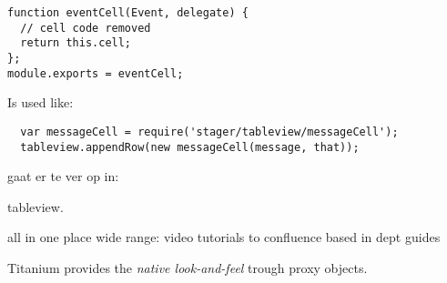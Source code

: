 \begin{verbatim}
function eventCell(Event, delegate) {
  // cell code removed
  return this.cell;
};
module.exports = eventCell;
\end{verbatim}

Is used like:
\begin{verbatim}
  var messageCell = require('stager/tableview/messageCell');
  tableview.appendRow(new messageCell(message, that));
\end{verbatim}

gaat er te ver op in:




tableview.

all in one place
wide range: video tutorials to confluence based in dept guides


Titanium provides the \emph{native look-and-feel} trough proxy objects. 
